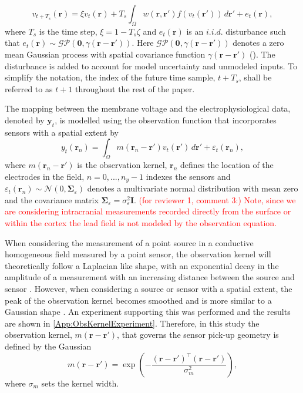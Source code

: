 \documentclass[review,authoryear,3p]{elsarticle}
\newcommand{\dean}[1]{\textcolor{red}{#1}}
\begin{document}
\begin{equation}
	\label{DiscreteTimeModel} 
	v_{t+T_s}\left(\mathbf{r}\right) = 
	\xi v_t\left(\mathbf{r}\right) + 
	T_s \int_\Omega { 
	    w\left(\mathbf{r},\mathbf{r}'\right)
	    f\left(v_t\left(\mathbf{r}'\right)\right) 
	\, d\mathbf{r}'} 
	+ e_t\left(\mathbf{r}\right), 
\end{equation}
where $T_s$ is the time step, $\xi = 1-T_s\zeta $ and $e_t(\mathbf{r})$ is an $i.i.d.$ disturbance such that $e_t(\mathbf{r})\sim\mathcal{GP}(\mathbf 0,\gamma(\mathbf{r}-\mathbf{r}'))$. Here $\mathcal{GP}(\mathbf 0,\gamma(\mathbf{r}-\mathbf{r}'))$ denotes a zero mean Gaussian process with spatial covariance function $\gamma(\mathbf{r}-\mathbf{r}')$ (\cite{Rasmussen2005}). The disturbance is added to account for model uncertainty and unmodeled inputs. To simplify the notation, the index of the future time sample, $t+T_s$, shall be referred to as $t+1$ throughout the rest of the paper. 

The mapping between the membrane voltage and the electrophysiological data, denoted by $\mathbf{y}_t$, is modelled using the observation function that incorporates sensors with a spatial extent by
\begin{equation}\label{eq:ObservationEquation}
	y_t(\mathbf{r}_n) = \int_{\Omega} { m\left(\mathbf{r}_n-\mathbf{r}'\right) v_t\left(\mathbf{r}'\right) \, d\mathbf{r}'} + \varepsilon_t(\mathbf{r}_n), 
\end{equation}
where $m\left(\mathbf{r}_n-\mathbf{r}'\right)$ is the observation kernel, $\mathbf{r}_n$ defines the location of the electrodes in the field, $n=0,...,n_y-1$ indexes the sensors and $\varepsilon_t(\mathbf{r}_n) \sim \mathcal{N}\left(0,\boldsymbol{\Sigma}_{\varepsilon}\right)$ denotes a multivariate normal distribution with mean zero and the covariance matrix $\boldsymbol{\Sigma}_{\varepsilon} = \sigma_{\varepsilon}^2\mathbf{I}$. \dean{(for reviewer 1, comment 3:) Note, since we are considering intracranial measurements recorded directly from the surface or within the cortex the lead field is not modeled by the observation equation.} 

When considering the measurement of a point source in a conductive homogeneous field measured by a point sensor, the observation kernel will theoretically follow a Laplacian like shape, with an exponential decay in the amplitude of a measurement with an increasing distance between the source and sensor \citep{Jackson1999}. However, when considering a source or sensor with a spatial extent, the peak of the observation kernel becomes smoothed and is more similar to a Gaussian shape \citep{Jackson1999}. An experiment supporting this was performed and the results are shown in \ref{App:ObsKernelExperiment}. Therefore, in this study the observation kernel, $m(\mathbf{r}-\mathbf{r}')$, that governs the sensor pick-up geometry is defined by the Gaussian
\begin{equation}
	m\left(\mathbf{r}-\mathbf{r}'\right) = \exp{\left(-\frac{(\mathbf{r}-\mathbf{r}')^\top(\mathbf{r}-\mathbf{r}')}{\sigma_m^2}\right)},
\end{equation}
where $\sigma_m$ sets the kernel width. 
\end{document}
